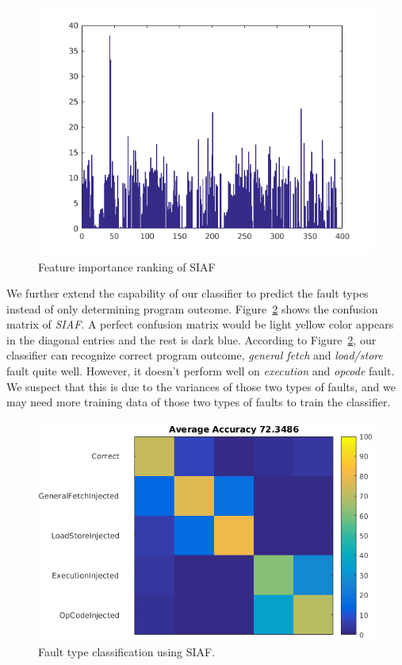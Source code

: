 \begin{figure}[ht]
\begin{center}
   \includegraphics[width=0.8\linewidth]{./figures/feat_same.png}
\end{center}
   \caption{Feature importance ranking of SIAF}
\label{fig:feat-same}
\end{figure}

We further extend the capability of our classifier to predict the fault types instead of only determining program outcome.
Figure~\ref{fig:siaf-multi} shows the confusion matrix of \emph{SIAF}. A perfect confusion matrix would be light yellow color appears in the diagonal entries and the rest is dark blue. According to Figure~\ref{fig:siaf-multi}, our classifier can recognize correct program outcome, \emph{general fetch} and \emph{load/store} fault quite well. However, it doesn't perform well on \emph{execution} and \emph{opcode} fault. We suspect that this is due to the variances of those two types of faults, and we may need more training data of those two types of faults to train the classifier.

\begin{figure}[ht]
\begin{center}
   \includegraphics[width=0.8\linewidth]{./figures/siaf_multi.png}
\end{center}
   \caption{Fault type classification using SIAF.}
\label{fig:siaf-multi}
\end{figure}

